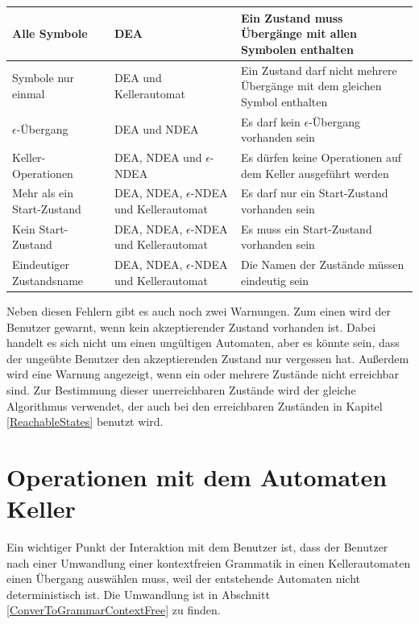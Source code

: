 \noindent
\begin{tabular}{|p{2.1cm}|p{2.7cm}|p{6.0cm}|}
  \hline
  Alle Symbole &
  DEA &
  Ein Zustand muss Übergänge mit allen Symbolen enthalten \\
  \hline
  Symbole nur einmal &
  DEA und Kellerautomat &
  Ein Zustand darf nicht mehrere Übergänge mit dem gleichen Symbol enthalten \\
  \hline
  $\epsilon$-Übergang &
  DEA und NDEA &
  Es darf kein $\epsilon$-Übergang vorhanden sein \\
  \hline
  Keller-Operationen &
  DEA, NDEA und $\epsilon$-NDEA &
  Es dürfen keine Operationen auf dem Keller ausgeführt werden \\
  \hline
  Mehr als ein Start-Zustand &
  DEA, NDEA, $\epsilon$-NDEA und Kellerautomat&
  Es darf nur ein Start-Zustand vorhanden sein \\
  \hline
  Kein Start-Zustand &
  DEA, NDEA, $\epsilon$-NDEA und Kellerautomat&
  Es muss ein Start-Zustand vorhanden sein \\
  \hline
  Eindeutiger Zustandsname &
  DEA, NDEA, $\epsilon$-NDEA und Kellerautomat&
  Die Namen der Zustände müssen eindeutig sein \\
  \hline
\end{tabular}
\vspace{10pt}

\noindent
Neben diesen Fehlern gibt es auch noch zwei Warnungen. Zum einen wird der
Benutzer gewarnt, wenn kein akzeptierender Zustand vorhanden ist. Dabei handelt
es sich nicht um einen ungültigen Automaten, aber es könnte sein, dass der
ungeübte Benutzer den akzeptierenden Zustand nur vergessen hat. Außerdem wird
eine Warnung angezeigt, wenn ein oder mehrere Zustände nicht erreichbar sind.
Zur Bestimmung dieser unerreichbaren Zustände wird der gleiche Algorithmus
verwendet, der auch bei den erreichbaren Zuständen in Kapitel
\ref{ReachableStates} benutzt wird.\vspace{10pt}


\section{Operationen mit dem Automaten Keller}\label{InteractionPDA}

Ein wichtiger Punkt der Interaktion mit dem Benutzer ist, dass der Benutzer
nach einer Umwandlung einer kontextfreien Grammatik in einen Kellerautomaten
einen Übergang auswählen muss, weil der entstehende Automaten nicht
deterministisch ist. Die Umwandlung ist in Abschnitt
\ref{ConverToGrammarContextFree} zu finden.\vspace{10pt}

